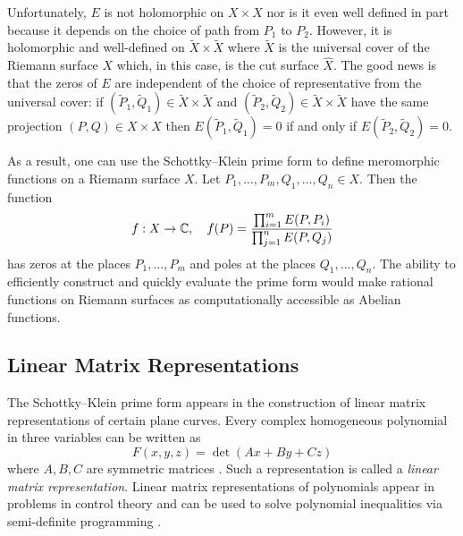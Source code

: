 Unfortunately, $E$ is not holomorphic on $X \times X$ nor is it even
well defined in part because it depends on the choice of path from $P_1$
to $P_2$. However, it is holomorphic and well-defined on $\tilde{X}
\times \tilde{X}$ where $\tilde{X}$ is the universal cover of the
Riemann surface $X$ which, in this case, is the cut surface
$\hat{X}$. The good news is that the zeros of $E$ are independent of the
choice of representative from the universal cover: if
$(\tilde{P}_1,\tilde{Q}_1) \in \tilde{X} \times \tilde{X}$ and
$(\tilde{P}_2,\tilde{Q}_2) \in \tilde{X} \times \tilde{X}$ have the same
projection $(P,Q) \in X \times X$ then $E(\tilde{P}_1,\tilde{Q}_1) = 0$
if and only if $E(\tilde{P}_2,\tilde{Q}_2) = 0$.

As a result, one can use the Schottky--Klein prime form to define
meromorphic functions on a Riemann surface $X$. Let
$P_1,\ldots,P_m,Q_1,\ldots,Q_n \in X$. Then the function
\[
    f : X \to \operatorname{\mathbb{C}}, \quad
    f(P) = \frac{\prod_{i=1}^m E(P,P_i)}{\prod_{j=1}^n E(P,Q_j)}
\]
has zeros at the places $P_1,\ldots,P_m$ and poles at the places
$Q_1,\ldots,Q_n$. The ability to efficiently construct and quickly
evaluate the prime form would make rational functions on Riemann
surfaces as computationally accessible as Abelian functions.


\subsection{Linear Matrix Representations}

The Schottky--Klein prime form appears in the construction of linear
matrix representations of certain plane curves. Every complex homogeneous
polynomial in three variables can be written as
\[
    F(x,y,z) = \det \left( Ax + By + Cz \right)
\]
where $A,B,C$ are symmetric matrices \cite{Quarez12}. Such a
representation is called a {\it linear matrix representation}. Linear
matrix representations of polynomials appear in problems in control
theory and can be used to solve polynomial inequalities via semi-definite
programming \cite{HeltonVinnikov07,PSV10}.

